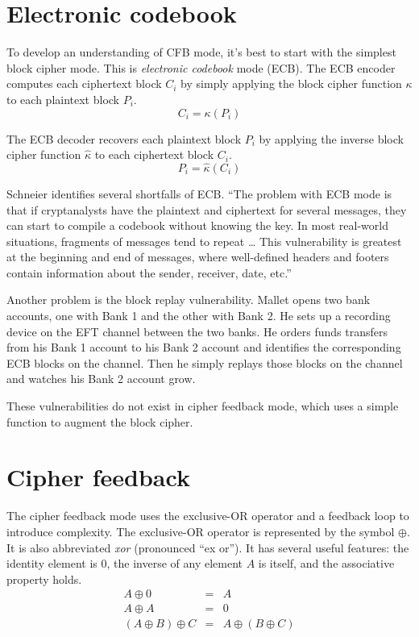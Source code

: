 \documentclass{article}
\begin{document}
\section*{Electronic codebook}

To develop an understanding of CFB mode, 
it's best to start with the simplest block cipher mode.
This is \emph{electronic codebook} mode (ECB).
The ECB encoder computes each ciphertext block $C_i$ by simply
applying the block cipher function $\kappa$ to each plaintext block $P_i$.
\[ C_i = \kappa(P_i) \]

The ECB decoder recovers each plaintext block $P_i$ by
applying the inverse block cipher function $\hat{\kappa}$ 
to each ciphertext block $C_i$.
\[ P_i = \hat{\kappa}(C_i) \]

Schneier identifies several shortfalls of ECB.
``The problem with ECB mode is that if cryptanalysts have the plaintext and ciphertext
for several messages, they can start to compile a codebook without knowing the key.
In most real-world situations, fragments of messages tend to repeat \ldots
This vulnerability is greatest at the beginning and end of messages,
where well-defined headers and footers contain information about the sender,
receiver, date, etc.''

Another problem is the block replay vulnerability.
Mallet opens two bank accounts, one with Bank 1 and the other with Bank 2.
He sets up a recording device on the EFT channel between the two banks.
He orders funds transfers from his Bank 1 account to his Bank 2 account
and identifies the corresponding ECB blocks on the channel.
Then he simply replays those blocks on the channel and watches his Bank 2 account grow.

These vulnerabilities do not exist in cipher feedback mode,
which uses a simple function to augment the block cipher.


\section*{Cipher feedback}

The cipher feedback mode uses the exclusive-OR operator
and a feedback loop to introduce complexity.
The exclusive-OR operator is represented by the symbol $\oplus$.
It is also abbreviated \emph{xor} (pronounced ``ex or'').
It has several useful features: the identity element is 0,
the inverse of any element $A$ is itself, and 
the associative property holds.
\begin{eqnarray}
  A \oplus 0 &=& A \\
  A \oplus A &=& 0 \\
  (A \oplus B) \oplus C &=& A \oplus (B \oplus C)
\end{eqnarray}
\end{document}
